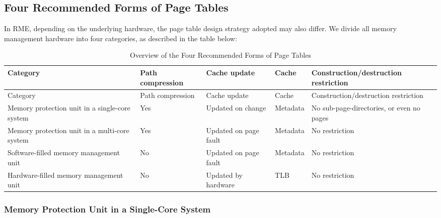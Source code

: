 \subsection{Four Recommended Forms of Page Tables}\label{subsec:8-four-recommended-page-table-forms}
\nopagebreak[4]

In RME, depending on the underlying hardware, the page table design strategy adopted may also differ. We divide all memory management hardware into four categories, as described in the table below:

\begin{xltabular}{\textwidth}{@{}>{\hsize\raggedright\arraybackslash}X>{\hsize\raggedright\arraybackslash}X>{\hsize\raggedright\arraybackslash}X>{\hsize\raggedright\arraybackslash}X>{\hsize\raggedright\arraybackslash}X@{}}
\caption{Overview of the Four Recommended Forms of Page Tables}\label{tab:8-2-four-recommended-page-table-forms}\\
\toprule
Category & Path compression & Cache update & Cache & Construction/\allowbreak destruction restriction\tabularnewline
\endfirsthead
\toprule
Category & Path compression & Cache update & Cache & Construction/\allowbreak destruction restriction\tabularnewline
\midrule
\endhead
\bottomrule
\endlastfoot
Memory protection unit in a single-core system & Yes & Updated on change & Metadata &
No sub-page-directories, or even no pages\tabularnewline
Memory protection unit in a multi-core system & Yes & Updated on page fault & Metadata & No restriction\tabularnewline
Software-filled memory management unit & No & Updated on page fault & Metadata &
No restriction\tabularnewline
Hardware-filled memory management unit & No & Updated by hardware & TLB & No restriction\tabularnewline
\end{xltabular}
\nopagebreak[4]

\subsubsection{Memory Protection Unit in a Single-Core System}\label{subsubsec:8-single-core-mpu}

